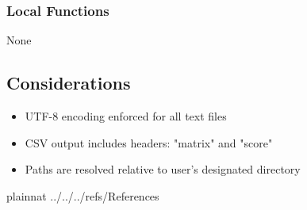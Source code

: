 \documentclass[12pt, titlepage]{article}
\begin{document}
\subsubsection{Local Functions}

None

\subsection{Considerations}

\begin{itemize}
    \item UTF-8 encoding enforced for all text files
    \item CSV output includes headers: "matrix" and "score"
    \item Paths are resolved relative to user's designated directory
\end{itemize}

\newpage


 {plainnat}
 {../../../refs/References}








% 
\end{document}
